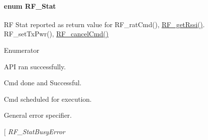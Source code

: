 \paragraph[{R\+F\+\_\+\+Stat}]{\setlength{\rightskip}{0pt plus 5cm}enum {\bf R\+F\+\_\+\+Stat}}\label{_r_f_8h_afdc219ddabc8427ecd552a6c78d9988f}


R\+F Stat reported as return value for R\+F\+\_\+rat\+Cmd(), \hyperlink{_r_f_8h_ac3fe0d39243fb6bbefe0216d958a6779}{R\+F\+\_\+get\+Rssi()}. R\+F\+\_\+set\+Tx\+Pwr(), \hyperlink{_r_f_8h_aabe22ceae13a372be4ba135318aa849a}{R\+F\+\_\+cancel\+Cmd()} 

\begin{Desc}
\item[Enumerator]\par
\begin{description}
\item[{\em 
R\+F\+\_\+\+Stat\+Success\label{_r_f_8h_afdc219ddabc8427ecd552a6c78d9988faa98bd78e437864464cdb2aca1d3e024d}
}]A\+P\+I ran successfully. \item[{\em 
R\+F\+\_\+\+Stat\+Cmd\+Done\+Success\label{_r_f_8h_afdc219ddabc8427ecd552a6c78d9988faa110d04edae5a85a12906d729f97de87}
}]Cmd done and Successful. \item[{\em 
R\+F\+\_\+\+Stat\+Cmd\+Sch\label{_r_f_8h_afdc219ddabc8427ecd552a6c78d9988fabf33d4930fd89cd5ca80220da258d31c}
}]Cmd scheduled for execution. \item[{\em 
R\+F\+\_\+\+Stat\+Error\label{_r_f_8h_afdc219ddabc8427ecd552a6c78d9988fac071b8de44aabb8e2354432ce1146b86}
}]General error specifier. \item[{\em 
R\+F\+\_\+\+Stat\+Busy\+Error\label{_r_f_8h_afdc219ddabc8427ecd552a6c78d9988faa79a13241903199d3bc25c8f06407de9}
}
\end{description}
\end{Desc}
